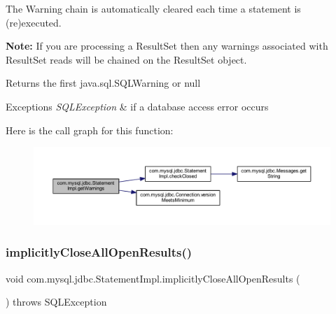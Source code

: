 The Warning chain is automatically cleared each time a statement is (re)executed. 

{\bfseries Note\+:} If you are processing a Result\+Set then any warnings associated with Result\+Set reads will be chained on the Result\+Set object. 

\begin{DoxyReturn}{Returns}
the first java.\+sql.\+S\+Q\+L\+Warning or null
\end{DoxyReturn}

\begin{DoxyExceptions}{Exceptions}
{\em S\+Q\+L\+Exception} & if a database access error occurs \\
\hline
\end{DoxyExceptions}
Here is the call graph for this function\+:
\nopagebreak
\begin{figure}[H]
\begin{center}
\leavevmode
\includegraphics[width=350pt]{classcom_1_1mysql_1_1jdbc_1_1_statement_impl_ab213540e1a8c3dc18168ef8b9cbfe29e_cgraph}
\end{center}
\end{figure}
\mbox{\label{classcom_1_1mysql_1_1jdbc_1_1_statement_impl_aeb89691311bd70ba70c7e4bfd510a182}} 
\subsubsection{\texorpdfstring{implicitly\+Close\+All\+Open\+Results()}{implicitlyCloseAllOpenResults()}}
{\footnotesize\ttfamily void com.\+mysql.\+jdbc.\+Statement\+Impl.\+implicitly\+Close\+All\+Open\+Results (\begin{DoxyParamCaption}{ }\end{DoxyParamCaption}) throws S\+Q\+L\+Exception\hspace{0.3cm}{\ttfamily [protected]}}

